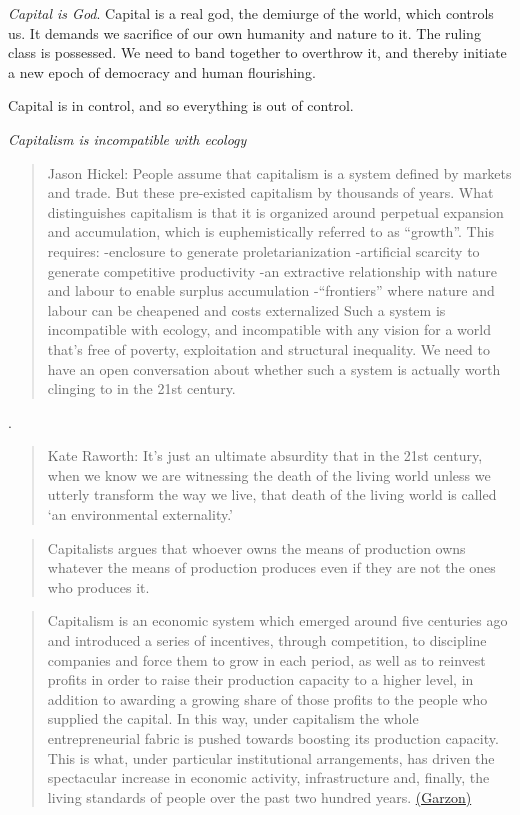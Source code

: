 \documentclass[
]{book}
\begin{document}
\emph{Capital is God}.
Capital is a real god, the demiurge of the world, which controls us. It demands we sacrifice of our own humanity and nature to it. The ruling class is possessed. We need to band together to overthrow it, and thereby initiate a new epoch of democracy and human flourishing.

Capital is in control, and so everything is out of control.

\emph{Capitalism is incompatible with ecology}

\begin{quote}
Jason Hickel: People assume that capitalism is a system
defined by markets and trade.
But these pre-existed capitalism by thousands of years.
What distinguishes capitalism is that it is organized around
perpetual expansion and accumulation,
which is euphemistically referred to as ``growth''.
This requires:
-enclosure to generate proletarianization
-artificial scarcity to generate competitive productivity
-an extractive relationship with nature and labour to enable surplus accumulation
-``frontiers'' where nature and labour can be cheapened and costs externalized
Such a system is incompatible with ecology, and incompatible with any vision
for a world that's free of poverty, exploitation and structural inequality.
We need to have an open conversation about whether such a system is actually
worth clinging to in the 21st century.
\end{quote}

.

\begin{quote}
Kate Raworth: It's just an ultimate absurdity that in the 21st century,
when we know we are witnessing the death of the living world
unless we utterly transform the way we live,
that death of the living world is called `an environmental externality.'
\end{quote}

\begin{quote}
Capitalists argues that whoever owns the means of
production owns whatever the means of production
produces even if they are not the ones who produces it.
\end{quote}

\begin{quote}
Capitalism is an economic system which emerged around five centuries ago and introduced a series of incentives, through competition, to discipline companies and force them to grow in each period, as well as to reinvest profits in order to raise their production capacity to a higher level, in addition to awarding a growing share of those profits to the people who supplied the capital. In this way, under capitalism the whole entrepreneurial fabric is pushed towards boosting its production capacity. This is what, under particular institutional arrangements, has driven the spectacular increase in economic activity, infrastructure and, finally, the living standards of people over the past two hundred years. \href{https://la-u.org/the-limits-to-growth-eco-socialism-or-barbarism/}{(Garzon)}
\end{quote}
\end{document}
